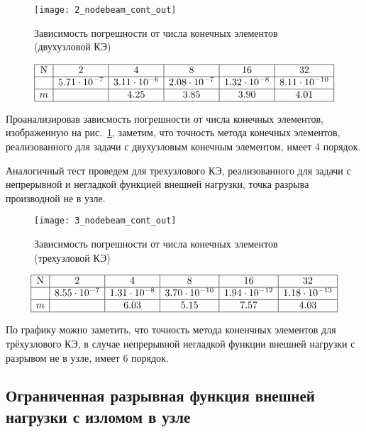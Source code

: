 \documentclass[12pt,a4paper]{article}
\begin{document}
\begin{figure}[H]
		\centering
		\texttt{[image: 2\_nodebeam\_cont\_out]}
		\caption{Зависимость погрешности от числа конечных элементов (двухузловой КЭ)}
		\label{fig:2_nodebeam_cont_out}
	\end{figure}


\[
\begin{array}{|c|c|c|c|c|c|}
\hline
\text{N} & 2 & 4 & 8 & 16 & 32 \\ \hline
\Delta  & 5.71 \cdot 10^{-7} & 3.11 \cdot 10^{-6} & 2.08 \cdot 10^{-7} & 1.32 \cdot 10^{-8} & 8.11 \cdot 10^{-10}\\ \hline
m  &  &4.25 & 3.85 & 3.90 & 4.01 \\ 
\hline
\end{array}
\]

Проанализировав зависмость погрешности от числа конечных элементов, изображенную на рис.~\ref{fig:2_nodebeam_cont_out}, заметим, что точность метода конечных элементов, реализованного для задачи с двухузловым конечным элементом, имеет 4 порядок. 


Аналогичный тест проведем для трехузлового КЭ, реализованного для задачи с непрерывной и негладкой функцией внешней нагрузки, точка разрыва производной не в узле.  
\begin{figure}[H]
		\centering
		\texttt{[image: 3\_nodebeam\_cont\_out]}
		\caption{Зависимость погрешности от числа конечных элементов (трехузловой КЭ)}
		\label{3_nodebeam_cont_out}
	\end{figure}


\[
\begin{array}{|c|c|c|c|c|c|}
\hline
\text{N} & 2 & 4 & 8 & 16 & 32 \\ \hline
\Delta  & 8.55 \cdot 10^{-7} & 1.31 \cdot 10^{-8} & 3.70 \cdot 10^{-10} & 1.94 \cdot 10^{-12} & 1.18 \cdot 10^{-13}  \\ \hline
m  & & 6.03 & 5.15 & 7.57 & 4.03 \text{} \\ 
\hline
\end{array}
\]

По графику можно заметить, что точность метода коненчных элементов для трёхузлового КЭ, в случае непрерывной негладкой функции внешней нагрузки с разрывом не в узле, имеет 6 порядок.\\





\subsection[Ограниченная функция внешней нагрузки с \glqq изломом \grqq в узле]{Ограниченная разрывная функция внешней нагрузки с \glqq изломом \grqq в узле}
\end{document}
